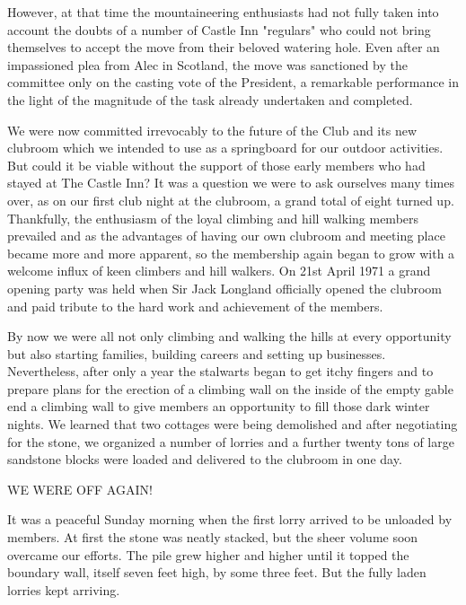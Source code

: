 \documentclass[a5paper,openany,font 10pt]{scrbook}
\begin{document}
However, at that time the mountaineering enthusiasts had not
fully taken into account the doubts of a number of Castle Inn
"regulars" who could not bring themselves to accept the move from
their beloved watering hole. Even after an impassioned plea from
Alec in Scotland, the move was sanctioned by the committee only
on the casting vote of the President, a remarkable performance in
the light of the magnitude of the task already undertaken and
completed.

We were now committed irrevocably to the future of the Club
and its new clubroom which we intended to use as a springboard
for our outdoor activities. But could it be viable without the
support of those early members who had stayed at The Castle Inn?
It was a question we were to ask ourselves many times over, as on
our first club night at the clubroom, a grand total of eight
turned up. Thankfully, the enthusiasm of the loyal climbing and
hill walking members prevailed and as the advantages of having
our own clubroom and meeting place became more and more apparent,
so the membership again began to grow with a welcome influx of
keen climbers and hill walkers. On 21st April 1971 a grand
opening party was held when Sir Jack Longland officially opened
the clubroom and paid tribute to the hard work and achievement of
the members.

By now we were all not only climbing and walking the hills
at every opportunity but also starting families, building careers
and setting up businesses. Nevertheless, after only a year the
stalwarts began to get itchy fingers and to prepare plans for the
erection of a climbing wall on the inside of the empty gable end
a climbing wall to give members an opportunity to fill those dark
winter nights. We learned that two cottages were being demolished
and after negotiating for the stone, we organized a number of
lorries and a further twenty tons of large sandstone blocks were
loaded and delivered to the clubroom in one day.

WE WERE OFF AGAIN!

It was a peaceful Sunday morning when the first lorry
arrived to be unloaded by members. At first the stone was neatly
stacked, but the sheer volume soon overcame our efforts. The pile
grew higher and higher until it topped the boundary wall, itself
seven feet high, by some three feet. But the fully laden lorries
kept arriving.
\end{document}
